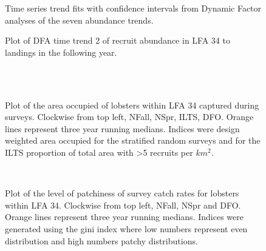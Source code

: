 \documentclass[11pt]{article}
\newcommand{\e}{/SpinDr/backup/bio_data/bio.lobster/figures/LFA3438Framework2019/} %
\begin{document}
\begin{figure}
    \centering
        \caption{Time series trend fits with confidence intervals from Dynamic Factor analyses of the seven abundance trends.}

    \end{figure}

\begin{figure}
    \centering
        \caption{Plot of DFA time trend 2 of recruit abundance in LFA 34 to landings in the following year.}

    \end{figure}

    
\begin{figure}
        \centering
    \\
                \\
        
         \caption{Plot of the area occupied of lobsters within LFA 34 captured during surveys. Clockwise from top left, NFall, NSpr, ILTS, DFO.
         Orange lines represent three year running medians. Indices were design weighted area occupied for the stratified random surveys and for the ILTS proportion of total area with \textgreater 5 recruits per $km^2$.}
        \end{figure}

    
\begin{figure}
        \centering
    \\
        
         \caption{Plot of the level of patchiness of survey catch rates for lobsters within LFA 34. Clockwise from top left, NFall, NSpr and DFO.
         Orange lines represent three year running medians. Indices were generated using the gini index where low numbers represent even distribution and high numbers patchy distributions.}
        \end{figure}
\end{document}
